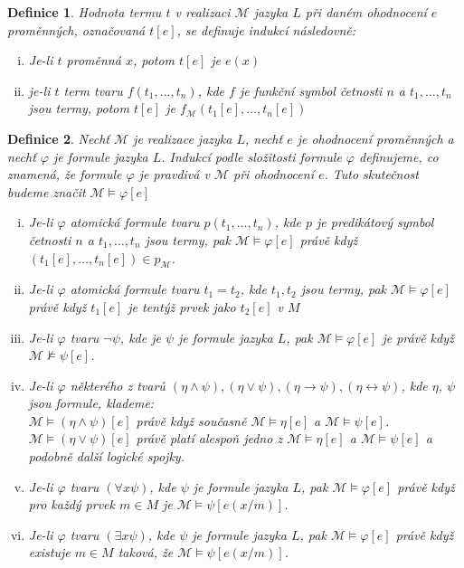 \documentclass[a4paper, 11pt]{report}
\newtheorem{mydef}{Definice}[chapter]
\begin{document}
\begin{mydef}
\emph{Hodnota termu} $t$ v realizaci $\mathcal{M}$ jazyka $L$ při daném ohodnocení $e$ proměnných, označovaná $t[e]$, se definuje indukcí následovně:
\begin{enumerate}[(i)]
	\item Je-li $t$ proměnná $x$, potom $t[e]$ je $e(x)$
	\item je-li $t$ term tvaru $f(t_1, \dots, t_n)$, kde $f$ je funkční symbol četnosti $n$ a $t_1, \dots, t_n$ jsou termy, potom $t[e]$ je $f_\mathcal{M}(t_1[e], \dots, t_n[e])$
\end{enumerate}

\end{mydef}
\begin{mydef}
Nechť $\mathcal{M}$ je realizace jazyka $L$, nechť $e$ je ohodnocení proměnných a nechť $\varphi$ je formule jazyka $L$. Indukcí podle složitosti formule $\varphi$ definujeme, co znamená, že \emph{formule $\varphi$ je pravdivá v $\mathcal{M}$ při ohodnocení $e$}. Tuto skutečnost budeme značit $\mathcal{M} \models \varphi[e]$
\begin{enumerate}[(i)]
	\item Je-li $\varphi$ atomická formule tvaru $p(t_1, \dots, t_n)$, kde $p$ je predikátový symbol četnosti $n$ a $t_1, \dots, t_n$ jsou termy, pak $\mathcal{M} \models \varphi[e]$ právě když $(t_1[e], \dots, t_n[e]) \in p_\mathcal{M}$.
	\item Je-li $\varphi$ atomická formule tvaru $t_1 = t_2$, kde $t_1, t_2$ jsou termy, pak $\mathcal{M} \models \varphi[e]$ právě když $t_1[e]$ je tentýž prvek jako $t_2[e]$ v $M$
	\item Je-li $\varphi$ tvaru $\lnot \psi$, kde je $\psi$ je formule jazyka $L$, pak $\mathcal{M} \models \varphi[e]$ je právě když $\mathcal{M} \not\models \psi[e]$.
	\item Je-li $\varphi$ některého z tvarů $(\eta \land \psi), (\eta \lor \psi), (\eta \to \psi), (\eta \leftrightarrow \psi)$, kde $\eta$, $\psi$ jsou formule, klademe: \\
	$\mathcal{M} \models (\eta \land \psi)[e]$ právě když současně $\mathcal{M} \models \eta[e]$ a $\mathcal{M} \models \psi[e]$. \\
	$\mathcal{M} \models (\eta \lor \psi)[e]$ právě platí alespoň jedno z $\mathcal{M} \models \eta[e]$ a $\mathcal{M} \models \psi[e]$ a podobně další logické spojky.
	\item Je-li $\varphi$ tvaru $(\forall x \psi)$, kde $\psi$ je formule jazyka $L$, pak $\mathcal{M} \models \varphi[e]$ právě když pro každý prvek $m \in M$ je $\mathcal{M} \models \psi[e(x/m)]$.
	\item Je-li $\varphi$ tvaru $(\exists x \psi)$, kde $\psi$ je formule jazyka $L$, pak $\mathcal{M} \models \varphi[e]$ právě když existuje $m \in M$ taková, že $\mathcal{M} \models \psi[e(x/m)]$.
\end{enumerate}
\end{mydef}
\end{document}
